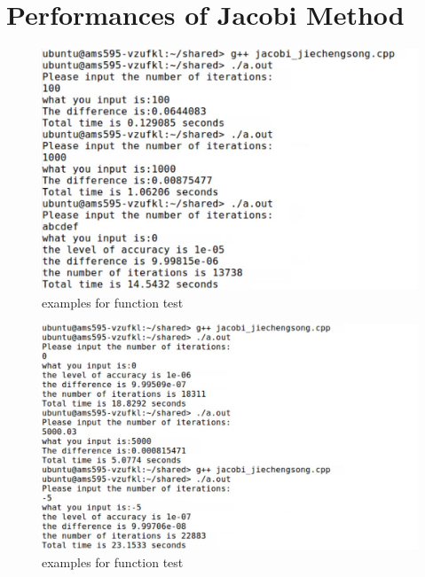 \documentclass[a4paper, 11pt]{article}
\begin{document}
\section*{Performances of Jacobi Method}
\begin{figure}[H]
\centering
\includegraphics[width=\textwidth]{jacobi1.jpg}
\caption{examples for function test}\label{fig:digit}
\end{figure}
\begin{figure}[H]
\centering
\includegraphics[width=\textwidth]{jacobi2.jpg}
\caption{examples for function test}\label{fig:digit}
\end{figure}
\end{document}
